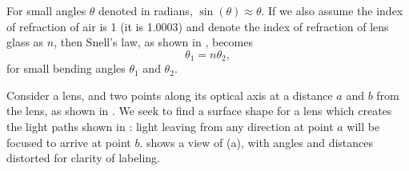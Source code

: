 For small angles $\theta$ denoted in radians, $\sin(\theta) \approx \theta$.  If we also assume the index of refraction of air is 1 (it is 1.0003) and denote the index of refraction of lens glass as $n$, then Snell's law, as shown in \fig{\ref{fig:snell}}, becomes
\begin{equation}
\theta_1 = n \theta_2,    
\end{equation}
for small bending angles $\theta_1$ and $\theta_2$.



Consider a lens, and two points along its optical axis at a distance $a$ and $b$ from the lens, as shown in .
We seek to find a surface shape for a lens which creates the light paths shown in :  light leaving from any direction at point $a$ will be focused to arrive at point $b$.   shows a view of \fig{\ref{fig:lens}}(a), with angles and distances distorted for clarity of labeling.

